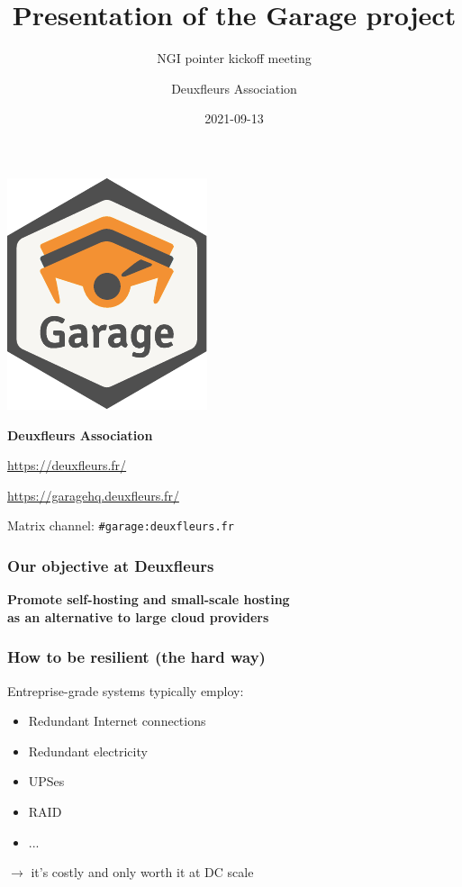 \documentclass[aspectratio=169]{beamer}
\title{Presentation of the Garage project}
\subtitle{NGI pointer kickoff meeting}
\author{Deuxfleurs Association}
\date{2021-09-13}
\begin{document}
\begin{frame}
	\centering
	\includegraphics[width=.3\linewidth]{../../sticker/Garage.pdf}
	\vspace{1em}

	{\large\bf Deuxfleurs Association}
	\vspace{1em}

	\url{https://deuxfleurs.fr/}

	\url{https://garagehq.deuxfleurs.fr/}

	Matrix channel: \texttt{\#garage:deuxfleurs.fr}
\end{frame}

\begin{frame}
	\frametitle{Our objective at Deuxfleurs}
	
	\begin{center}
		\textbf{Promote self-hosting and small-scale hosting\\
			as an alternative to large cloud providers}
	\end{center}
	\vspace{2em}
\end{frame}

\begin{frame}
	\frametitle{How to be resilient (the hard way)}

	Entreprise-grade systems typically employ:
	\vspace{1em}
	\begin{itemize}
		\item Redundant Internet connections
		\item Redundant electricity
		\item UPSes
		\item RAID
		\item ... 
	\end{itemize}
	\vspace{1em}
	$\to$ it's costly and only worth it at DC scale
\end{frame}
\end{document}
